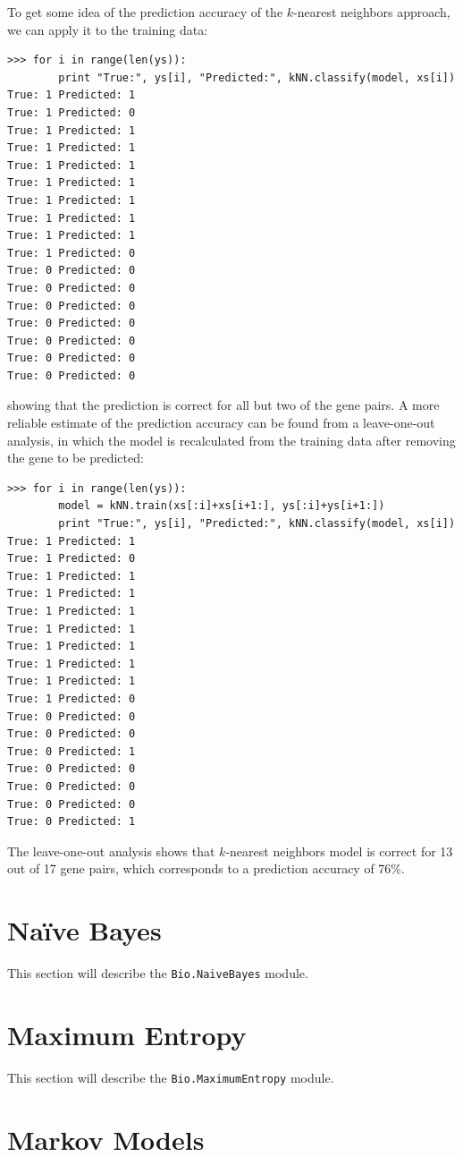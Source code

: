 \documentclass{report}
\begin{document}
To get some idea of the prediction accuracy of the $k$-nearest neighbors approach, we can apply it to the training data:
\begin{verbatim}
>>> for i in range(len(ys)):
        print "True:", ys[i], "Predicted:", kNN.classify(model, xs[i])
True: 1 Predicted: 1
True: 1 Predicted: 0
True: 1 Predicted: 1
True: 1 Predicted: 1
True: 1 Predicted: 1
True: 1 Predicted: 1
True: 1 Predicted: 1
True: 1 Predicted: 1
True: 1 Predicted: 1
True: 1 Predicted: 0
True: 0 Predicted: 0
True: 0 Predicted: 0
True: 0 Predicted: 0
True: 0 Predicted: 0
True: 0 Predicted: 0
True: 0 Predicted: 0
True: 0 Predicted: 0
\end{verbatim}
showing that the prediction is correct for all but two of the gene pairs. A more reliable estimate of the prediction accuracy can be found from a leave-one-out analysis, in which the model is recalculated from the training data after removing the gene to be predicted:
\begin{verbatim}
>>> for i in range(len(ys)):
        model = kNN.train(xs[:i]+xs[i+1:], ys[:i]+ys[i+1:])
        print "True:", ys[i], "Predicted:", kNN.classify(model, xs[i])
True: 1 Predicted: 1
True: 1 Predicted: 0
True: 1 Predicted: 1
True: 1 Predicted: 1
True: 1 Predicted: 1
True: 1 Predicted: 1
True: 1 Predicted: 1
True: 1 Predicted: 1
True: 1 Predicted: 1
True: 1 Predicted: 0
True: 0 Predicted: 0
True: 0 Predicted: 0
True: 0 Predicted: 1
True: 0 Predicted: 0
True: 0 Predicted: 0
True: 0 Predicted: 0
True: 0 Predicted: 1
\end{verbatim}
The leave-one-out analysis shows that $k$-nearest neighbors model is correct for 13 out of 17 gene pairs, which corresponds to a prediction accuracy of 76\%.

\section{Na\"ive Bayes}

This section will describe the \verb|Bio.NaiveBayes| module.

\section{Maximum Entropy}

This section will describe the \verb|Bio.MaximumEntropy| module.

\section{Markov Models}
\end{document}
